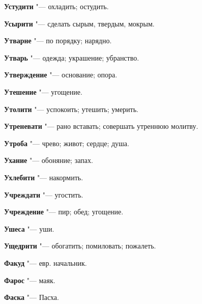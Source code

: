 \begin{mymulticols}{2}
\noindent\textbf{Устудити} "--- охладить; остудить. 




\noindent\textbf{Усырити} "--- сделать сырым, твердым, мокрым. 




\noindent\textbf{Утварне} "--- по порядку; нарядно. 




\noindent\textbf{Утварь} "--- одежда; украшение; убранство. 




\noindent\textbf{Утверждение} "--- основание; опора. 




\noindent\textbf{Утешение} "--- угощение. 




\noindent\textbf{Утолити} "--- успокоить; утешить; умерить. 




\noindent\textbf{Утреневати} "--- рано вставать; совершать утреннюю молитву. 




\noindent\textbf{Утроба} "--- чрево; живот; сердце; душа. 




\noindent\textbf{Ухание} "--- обоняние; запах. 




\noindent\textbf{Ухлебити} "--- накормить. 




\noindent\textbf{Учреждати} "--- угостить. 




\noindent\textbf{Учреждение} "--- пир; обед; угощение. 




\noindent\textbf{Ушеса} "--- уши. 




\noindent\textbf{Ущедрити} "--- обогатить; помиловать; пожалеть. 




\bukvaending






\noindent\textbf{Факуд} "--- евр. начальник. 




\noindent\textbf{Фарос} "--- маяк. 




\noindent\textbf{Фаска} "--- Пасха. 





\end{mymulticols}
